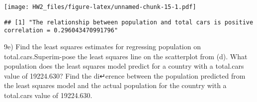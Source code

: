 \documentclass[
]{article}
\newenvironment{Shaded}{\begin{snugshade}}{\end{snugshade}}
\newcommand{\CommentTok}[1]{\textcolor[rgb]{0.56,0.35,0.01}{\textit{#1}}}
\newcommand{\ControlFlowTok}[1]{\textcolor[rgb]{0.13,0.29,0.53}{\textbf{#1}}}
\newcommand{\DecValTok}[1]{\textcolor[rgb]{0.00,0.00,0.81}{#1}}
\newcommand{\FunctionTok}[1]{\textcolor[rgb]{0.13,0.29,0.53}{\textbf{#1}}}
\newcommand{\NormalTok}[1]{#1}
\newcommand{\OtherTok}[1]{\textcolor[rgb]{0.56,0.35,0.01}{#1}}
\newcommand{\SpecialCharTok}[1]{\textcolor[rgb]{0.81,0.36,0.00}{\textbf{#1}}}
\newcommand{\StringTok}[1]{\textcolor[rgb]{0.31,0.60,0.02}{#1}}
\begin{document}
\texttt{[image: HW2\_files/figure-latex/unnamed-chunk-15-1.pdf]}

\begin{Shaded}
\end{Shaded}

\begin{verbatim}
## [1] "The relationship between population and total cars is positive correlation = 0.296043470991796"
\end{verbatim}

9e) Find the least squares estimates for regressing population on
total.cars.Superim-pose the least squares line on the scatterplot from
(d). What population does the least squares model predict for a country
with a total.cars value of 19224.630? Find the di↵erence between the
population predicted from the least squares model and the actual
population for the country with a total.cars value of 19224.630.

\begin{Shaded}
\end{Shaded}
\end{document}

